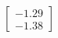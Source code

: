 \documentclass[preview]{standalone}
\begin{document}
\begin{align*}
\begin{bmatrix} -1.29 \\ -1.38 \end{bmatrix}
\end{align*}
\end{document}
